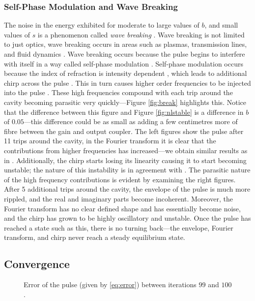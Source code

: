 \subsubsection{Self-Phase Modulation and Wave Breaking}

The noise in the energy exhibited for moderate to large values of $b$, and small values of $s$ is a phenomenon called \emph{wave breaking} \cite{agrawal2013, anderson, finot, rothenberg, tomlinson}. Wave breaking is not limited to just optics, wave breaking occurs in areas such as plasmas, transmission lines, and fluid dynamics \cite{rothenberg}. Wave breaking occurs because the pulse begins to interfere with itself in a way called self-phase modulation \cite{agrawal2002, agrawal2013, becker}. Self-phase modulation occurs because the index of refraction is intensity dependent \cite{agrawal2002, becker, rothenberg, silfvast}, which leads to additional chirp across the pulse \cite{agrawal2013, anderson, rothenberg, silfvast}. This in turn causes higher order frequencies to be injected into the pulse \cite{agrawal2013, anderson}. These high frequencies compound with each trip around the cavity becoming parasitic very quickly---Figure \ref{fig:break} highlights this. Notice that the difference between this figure and Figure \ref{fig:nlstable} is a difference in $b$ of $0.05$---this difference could be as small as adding a few centimetres more of fibre between the gain and output coupler. The left figures show the pulse after 11 trips around the cavity, in the Fourier transform it is clear that the contributions from higher frequencies has increased---we obtain similar results as in \cite{anderson, rothenberg}. Additionally, the chirp starts losing its linearity causing it to start becoming unstable; the nature of this instability is in agreement with \cite{anderson, rothenberg}. The parasitic nature of the high frequency contributions is evident by examining the right figures. After 5 additional trips around the cavity, the envelope of the pulse is much more rippled, and the real and imaginary parts become incoherent. Moreover, the Fourier transform has no clear defined shape and has essentially become noise, and the chirp has grown to be highly oscillatory and unstable. Once the pulse has reached a state such as this, there is no turning back---the envelope, Fourier transform, and chirp never reach a steady equilibrium state. \\

\subsection{Convergence}
\begin{figure}[tbp]

\caption{Error of the pulse (given by \eqref{eq:error}) between iterations $99$ and $100$.}
\label{fig:error}
\end{figure}

